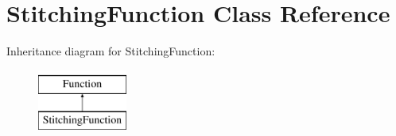 \hypertarget{class_stitching_function}{}\section{Stitching\+Function Class Reference}
\label{class_stitching_function}
Inheritance diagram for Stitching\+Function\+:\begin{figure}[H]
\begin{center}
\leavevmode
\includegraphics[height=2.000000cm]{class_stitching_function}
\end{center}
\end{figure}
